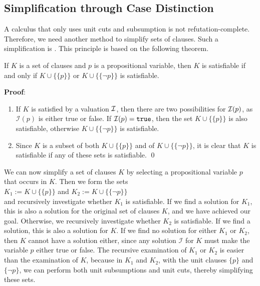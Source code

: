 \subsection{Simplification through Case Distinction}
A calculus that only uses unit cuts and subsumption is not refutation-complete. Therefore, we need another method to simplify sets of clauses.
Such a simplification is . This principle is based on the following theorem.

\begin{Satz}
  If $K$ is a set of clauses and $p$ is a propositional variable,
  then $K$ is satisfiable if and only if $K \cup \bigl\{\{p\}\bigr\}$ or
  $K \cup \bigl\{\{\neg p\}\bigr\}$ is satisfiable.
\end{Satz}

\noindent
\textbf{Proof}:
\begin{enumerate}
\item[``$\Rightarrow$'':] 
  If $K$ is satisfied by a valuation $\mathcal{I}$, then there are two possibilities for $\mathcal{I}(p)$, as 
  $\mathcal{I}(p)$ is either true or false. If $\mathcal{I}(p) = \texttt{true}$, then the set $K \cup
  \bigl\{\{p\}\bigr\}$ is also satisfiable,
  otherwise $K \cup \bigl\{\{\neg p\}\bigr\}$
  is satisfiable.
\item[``$\Leftarrow$'':] 
  Since $K$ is a subset of both $K \cup \bigl\{\{p\}\bigr\}$ and of 
  $K \cup \bigl\{\{\neg p\}\bigr\}$, it is clear that $K$ is satisfiable
  if any of these sets is satisfiable.
\qed
\end{enumerate}

We can now simplify a set of clauses $K$ by selecting a propositional variable $p$ that occurs in $K$.
Then we form the sets \\[0.2cm]
\hspace*{1.3cm} $K_1 := K \cup \bigl\{\{p\}\bigr\}$ \quad and \quad $K_2 := K \cup
\bigl\{\{\neg p\}\bigr\}$
\\[0.2cm]
and recursively investigate whether $K_1$ is satisfiable. If we find a solution for $K_1$,
this is also a solution for the original set of clauses $K$, and we have achieved our goal.
Otherwise, we recursively investigate whether $K_2$ is satisfiable.
If we find a solution, this is also a solution for $K$. If we find no solution
for either $K_1$ or $K_2$, then $K$ cannot have a solution either,
since any solution $\mathcal{I}$ for $K$ must make the variable $p$ either true or false.
The recursive examination of $K_1$ or $K_2$ is easier than the examination of $K$,
because in $K_1$ and $K_2$, with the unit clauses $\{p\}$ and $\{\neg p\}$,
we can perform both unit subsumptions and unit cuts, thereby simplifying these sets.

